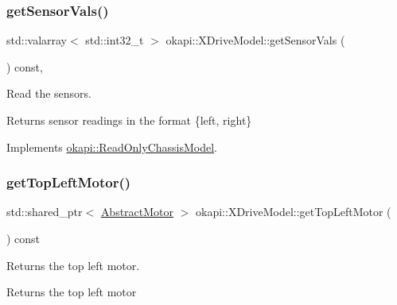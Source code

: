 \mbox{\label{classokapi_1_1XDriveModel_a3beef170f1e7fd988d815f335cafad1e}} 
\subsubsection{\texorpdfstring{getSensorVals()}{getSensorVals()}}
{\footnotesize\ttfamily std\+::valarray$<$ std\+::int32\+\_\+t $>$ okapi\+::\+X\+Drive\+Model\+::get\+Sensor\+Vals (\begin{DoxyParamCaption}{ }\end{DoxyParamCaption}) const\hspace{0.3cm}{\ttfamily [override]}, {\ttfamily [virtual]}}

Read the sensors.

\begin{DoxyReturn}{Returns}
sensor readings in the format \{left, right\} 
\end{DoxyReturn}


Implements \mbox{\hyperlink{classokapi_1_1ReadOnlyChassisModel_af2d844d9e12bb7c778ac9a5a0074f848}{okapi\+::\+Read\+Only\+Chassis\+Model}}.

\mbox{\label{classokapi_1_1XDriveModel_a6ffd50946ef2655b3d8c74c0d211101b}} 
\subsubsection{\texorpdfstring{getTopLeftMotor()}{getTopLeftMotor()}}
{\footnotesize\ttfamily std\+::shared\+\_\+ptr$<$ \mbox{\hyperlink{classokapi_1_1AbstractMotor}{Abstract\+Motor}} $>$ okapi\+::\+X\+Drive\+Model\+::get\+Top\+Left\+Motor (\begin{DoxyParamCaption}{ }\end{DoxyParamCaption}) const}

Returns the top left motor.

\begin{DoxyReturn}{Returns}
the top left motor 
\end{DoxyReturn}
\mbox{\label{classokapi_1_1XDriveModel_abd08edca41aa963c15fafc4b735c0e8d}} 
